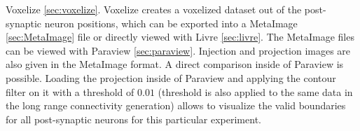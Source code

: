 Voxelize \ref{sec:voxelize}. Voxelize creates a voxelized dataset out of the post-synaptic neuron positions, which can be exported into
a MetaImage \ref{sec:MetaImage} file or directly viewed with Livre \ref{sec:livre}.
The MetaImage files can be viewed with Paraview \ref{sec:paraview}.
Injection and projection images are also given in the MetaImage format.
A direct comparison inside of Paraview is possible.
Loading the projection inside of Paraview and applying the contour filter on it with a threshold of $0.01$ (threshold is also applied to the same data in the long range connectivity generation) allows to visualize the valid boundaries for all post-synaptic neurons for this particular experiment.
 
\begin{figure}[ht!]
   	\begin{center}
        \hspace{0.2cm}
\end{center}
\end{figure}
